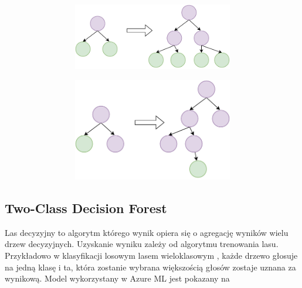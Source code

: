 \begin{figure}[H]
\begin{subfigure}[m]{0.3\textwidth}
    \end{subfigure}
    \hfill
    \begin{subfigure}[m]{0.66\textwidth}
        \begin{subfigure}[m]{\textwidth}
            \includegraphics[width=\textwidth]{images/level-wise}
        \end{subfigure}
        \begin{subfigure}[m]{\textwidth}
            \includegraphics[width=\textwidth]{images/leaf-wise}
        \end{subfigure}
        \label{fig:leaf}
    \end{subfigure}
\end{figure}

\subsection{Two-Class Decision Forest}
Las decyzyjny to algorytm którego wynik opiera się o agregację wyników wielu drzew decyzyjnych. Uzyskanie wyniku zależy od algorytmu trenowania lasu. Przykładowo w klasyfikacji losowym lasem wieloklasowym , każde drzewo głosuje na jedną klasę i ta, która zostanie wybrana większością głosów zostaje uznana za wynikową\cite{Google}. Model wykorzystany w Azure ML jest pokazany na 

